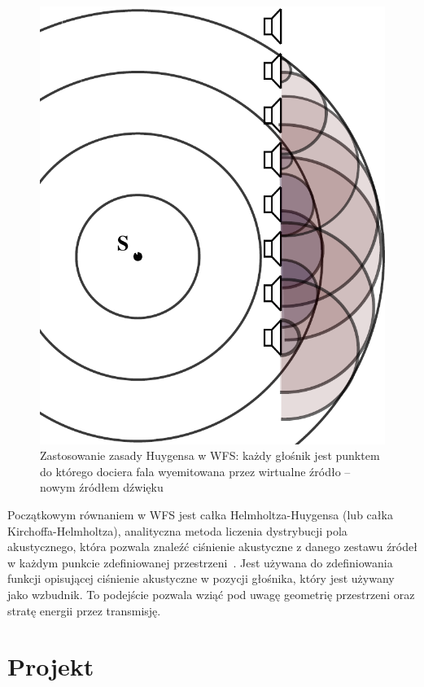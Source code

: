 \documentclass[12pt]{oska}
\let\Oldsection\section
\renewcommand{\section}{\FloatBarrier\Oldsection}
\begin{document}
\begin{figure}[!tbh]
  \centering
  \includegraphics[scale=.4]{vecgraphics/WFS_idea.pdf}
  \caption{Zastosowanie zasady Huygensa w WFS: każdy głośnik jest punktem do
    którego dociera fala wyemitowana przez wirtualne źródło -- nowym źródłem
  dźwięku}
  \label{r:Huygens}
\end{figure}

Początkowym równaniem w WFS jest całka Helmholtza-Huygensa (lub całka
Kirchoffa-Helmholtza), analityczna metoda liczenia dystrybucji pola
akustycznego, która pozwala znaleźć ciśnienie akustyczne z danego zestawu
źródeł w każdym punkcie zdefiniowanej przestrzeni~\cite{snaka}. Jest używana do
zdefiniowania funkcji opisującej ciśnienie akustyczne w pozycji głośnika, który
jest używany jako wzbudnik. To podejście pozwala wziąć pod uwagę geometrię
przestrzeni oraz stratę energii przez transmisję.

\section{Projekt}
\end{document}
